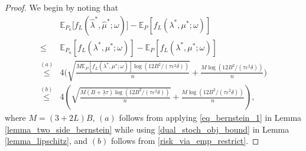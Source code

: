 \documentclass[10pt,a4paper]{amsart}
\newcommand{\EE}{\mathbb{E}}
\renewcommand{\frac}[2]{\tfrac{#1}{#2}}
\newcommand{\rbr}[1]{\left(#1\right)}
\newcommand{\sbr}[1]{\left[#1\right]}
\begin{document}
\begin{proof}
We begin by noting that  
\begin{align}
& \EE_{P_n} \big[{f_L (\hat{\lambda}^*, \hat{\mu}^*; \omega)}\big]
- 
\EE_{P} \sbr{f_L ({\lambda}^*, {\mu}^*; \omega)} \nonumber \\
\leq & 
\EE_{P_n} \sbr{f_L ({\lambda}^*, {\mu}^*; \omega)}
- 
\EE_{P} \sbr{f_L ({\lambda}^*, {\mu}^*; \omega)} 
\nonumber \\
\overset{(a)}{\leq} & 
 4 \bigg({
\sqrt{\frac{ M  {\EE_{P} \sbr{f_L ( \lambda^*,  \mu^*; \omega) }
} \log(12B^2/(\tau \varepsilon^2 \delta))}{n}} + \frac{ M \log(12B^2/(\tau \varepsilon^2 \delta))}{n} 
} \bigg)
\nonumber \\
\overset{(b)}{\leq} &   4 \rbr{
\sqrt{\frac{ M 
(B + \underline{\lambda} \tau  )
 \log(12B^2/(\tau \varepsilon^2 \delta))}{n}} + \frac{ M \log(12B^2/(\tau \varepsilon^2 \delta))}{n} 
}, \label{ineq_bernstein_at_pop_dual}
\end{align}
where $M = (3+2L)B$, $(a)$ follows from applying  \eqref{eq_bernstein_1} in  Lemma \ref{lemma_two_side_bernstein} while using  \eqref{dual_stoch_obj_bound} in Lemma \ref{lemma_lipschitz},
and $(b)$ follows from \eqref{risk_via_emp_restrict}.



\end{proof}
\end{document}

